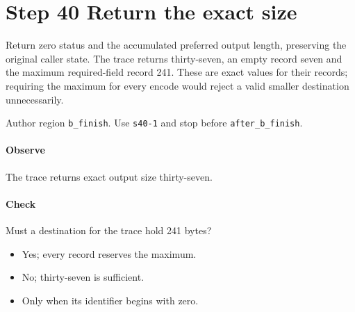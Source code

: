\section{Step 40 Return the exact size}\label{cbor-s40}
Return zero status and the accumulated preferred output length, preserving the original caller state. The trace returns thirty-seven, an empty record seven and the maximum required-field record 241. These are exact values for their records; requiring the maximum for every encode would reject a valid smaller destination unnecessarily.

Author region \texttt{b\_finish}. Use \texttt{s40-1} and stop before \texttt{after\_b\_finish}.

\paragraph{Observe} The trace returns exact output size thirty-seven.

\paragraph{Check} Must a destination for the trace hold 241 bytes?
\begin{itemize}
\item[A.] Yes; every record reserves the maximum.
\item[B.] No; thirty-seven is sufficient.
\item[C.] Only when its identifier begins with zero.
\end{itemize}
